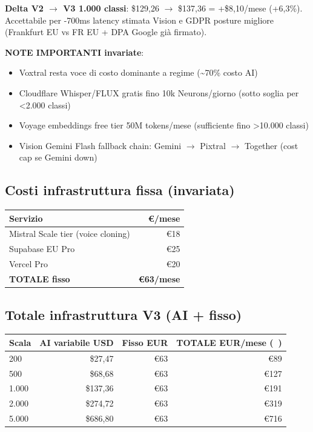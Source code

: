 \documentclass[12pt,a4paper]{article}
\begin{document}
\textbf{Delta V2 \(\rightarrow\) V3 1.000 classi}: \$129,26 \(\rightarrow\) \$137,36 = +\$8,10/mese (+6,3\%). Accettabile per -700ms latency stimata Vision e GDPR posture migliore (Frankfurt EU vs FR EU + DPA Google già firmato).

\textbf{NOTE IMPORTANTI invariate}:
\begin{itemize}[leftmargin=*]
  \item Voxtral resta voce di costo dominante a regime (\textasciitilde 70\% costo AI)
  \item Cloudflare Whisper/FLUX gratis fino 10k Neurons/giorno (sotto soglia per \textless 2.000 classi)
  \item Voyage embeddings free tier 50M tokens/mese (sufficiente fino \textgreater 10.000 classi)
  \item Vision Gemini Flash fallback chain: Gemini \(\rightarrow\) Pixtral \(\rightarrow\) Together (cost cap se Gemini down)
\end{itemize}

\subsection*{Costi infrastruttura fissa (invariata)}

\begin{center}
\begin{tabular}{lr}
\toprule
\textbf{Servizio} & \textbf{€/mese} \\
\midrule
Mistral Scale tier (voice cloning) & €18 \\
Supabase EU Pro                    & €25 \\
Vercel Pro                         & €20 \\
\textbf{TOTALE fisso}              & \textbf{€63/mese} \\
\bottomrule
\end{tabular}
\end{center}

\subsection*{Totale infrastruttura V3 (AI + fisso)}

\begin{center}
\begin{tabular}{lrrr}
\toprule
\textbf{Scala} & \textbf{AI variabile USD} & \textbf{Fisso EUR} & \textbf{TOTALE EUR/mese (~)} \\
\midrule
200    & \$27,47  & €63 & ~€89 \\
500    & \$68,68  & €63 & ~€127 \\
1.000  & \$137,36 & €63 & ~€191 \\
2.000  & \$274,72 & €63 & ~€319 \\
5.000  & \$686,80 & €63 & ~€716 \\
\bottomrule
\end{tabular}
\end{center}
\end{document}

